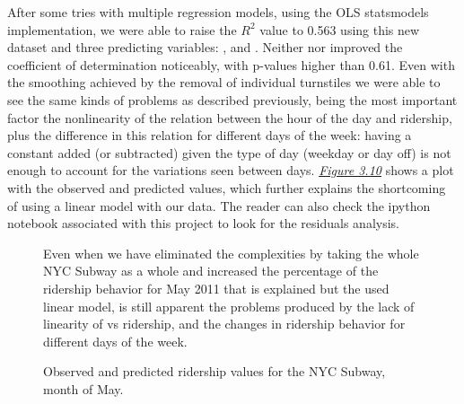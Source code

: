 \documentclass[a4paper,12pt,english]{sphinxmanual}
\begin{document}
After some tries with multiple regression models, using the OLS statsmodels
implementation, we were able to raise the \(R^2\) value to 0.563 using this
new dataset and three predicting variables: ,  and .
Neither  nor  improved the coefficient of determination
noticeably, with p-values higher than 0.61. Even with the smoothing achieved
by the removal of individual turnstiles we were able to see the same kinds of
problems as described previously, being the most important factor the
nonlinearity of the relation between the hour of the day and ridership, plus the
difference in this relation for different days of the week: having a constant
added (or subtracted) given the type of day (weekday or day off) is not enough
to account for the variations seen between days.
{\hyperref[section2:figure310]{\emph{Figure 3.10}}} shows a plot with the observed and predicted
values, which further explains the shortcoming of using a linear model with our
data. The reader can also check the ipython notebook associated with this
project to look for the residuals analysis.
\begin{figure}[htbp]
\centering
\capstart

\caption{Observed and predicted ridership values for the NYC Subway, month of May.}{\small 
Even when we have eliminated the complexities by taking the whole NYC Subway
as a whole and increased the percentage of the ridership behavior for May
2011 that is explained but the used linear model, is still apparent the
problems produced by the lack of linearity of  vs ridership, and the
changes in ridership behavior for different days of the week.
}\label{section2:figure310}\end{figure}
\end{document}

